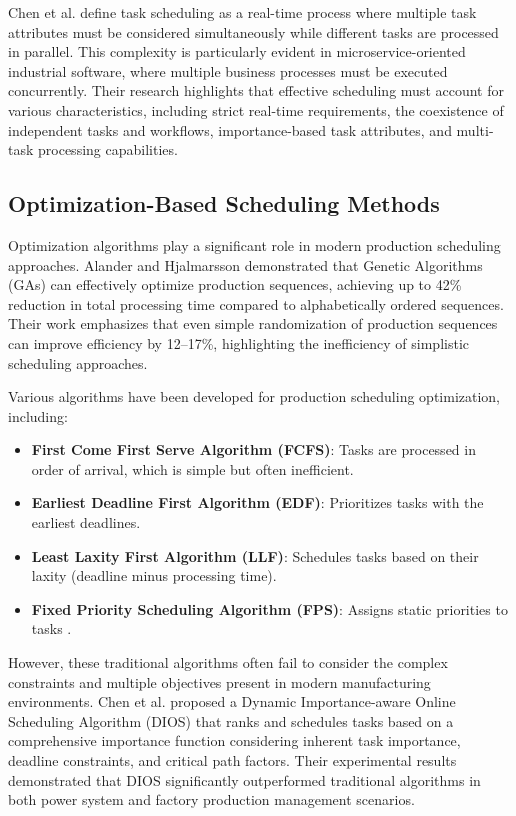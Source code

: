 Chen et al. \cite{chen2023} define task scheduling as a real-time process where multiple task attributes must be considered simultaneously while different tasks are processed in parallel. This complexity is particularly evident in microservice-oriented industrial software, where multiple business processes must be executed concurrently. Their research highlights that effective scheduling must account for various characteristics, including strict real-time requirements, the coexistence of independent tasks and workflows, importance-based task attributes, and multi-task processing capabilities.

\subsection{Optimization-Based Scheduling Methods}

Optimization algorithms play a significant role in modern production scheduling approaches. Alander and Hjalmarsson \cite{alander2024} demonstrated that Genetic Algorithms (GAs) can effectively optimize production sequences, achieving up to 42\% reduction in total processing time compared to alphabetically ordered sequences. Their work emphasizes that even simple randomization of production sequences can improve efficiency by 12--17\%, highlighting the inefficiency of simplistic scheduling approaches.

Various algorithms have been developed for production scheduling optimization, including:

\begin{itemize}
    \item \textbf{First Come First Serve Algorithm (FCFS)}: Tasks are processed in order of arrival, which is simple but often inefficient.
    \item \textbf{Earliest Deadline First Algorithm (EDF)}: Prioritizes tasks with the earliest deadlines.
    \item \textbf{Least Laxity First Algorithm (LLF)}: Schedules tasks based on their laxity (deadline minus processing time).
    \item \textbf{Fixed Priority Scheduling Algorithm (FPS)}: Assigns static priorities to tasks \cite{chen2023}.
\end{itemize}

However, these traditional algorithms often fail to consider the complex constraints and multiple objectives present in modern manufacturing environments. Chen et al. \cite{chen2023} proposed a Dynamic Importance-aware Online Scheduling Algorithm (DIOS) that ranks and schedules tasks based on a comprehensive importance function considering inherent task importance, deadline constraints, and critical path factors. Their experimental results demonstrated that DIOS significantly outperformed traditional algorithms in both power system and factory production management scenarios.

